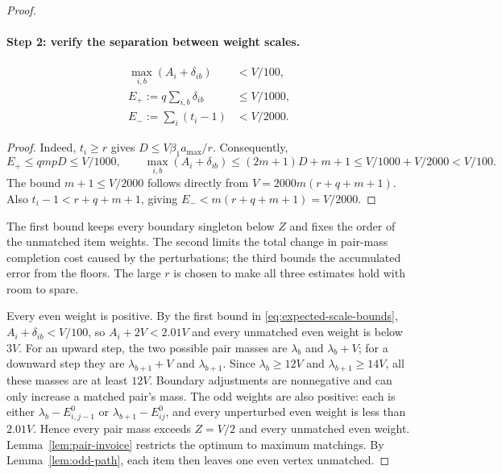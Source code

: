 \begin{proof}
\paragraph{Step 2: verify the separation between weight scales.}
\begin{claim}
\begin{equation}\label{eq:expected-scale-bounds}
 \begin{split}
 \max_{i,b}(A_i+\delta_{ib})&<V/100,\\
 E_+ :=q\sum_{i,b}\delta_{ib}&\le V/1000,\\
 E_- :=\sum_i(t_i-1)&<V/2000.
 \end{split}
\end{equation}
\end{claim}
\begin{proof}
Indeed, $t_i\ge r$ gives $D\le V\beta_1a_{\max}/r$.
Consequently,
\[
 E_+\le qmpD\le V/1000,
 \qquad
 \max_{i,b}(A_i+\delta_{ib})
 \le(2m+1)D+m+1
 \le V/1000+V/2000<V/100.
\]
The bound $m+1\le V/2000$ follows directly from
$V=2000m(r+q+m+1)$.
Also $t_i-1<r+q+m+1$, giving
$E_-<m(r+q+m+1)=V/2000$.
\end{proof}
The first bound keeps every boundary singleton below $Z$ and fixes
the order of the unmatched item weights. The second limits the total
change in pair-mass completion cost caused by the perturbations; the
third bounds the accumulated error from the floors. The large $r$
is chosen to make all three estimates hold with room to spare.

Every even weight is positive. By the first bound in
\eqref{eq:expected-scale-bounds}, $A_i+\delta_{ib}<V/100$, so
$A_i+2V<2.01V$ and every unmatched even weight is below $3V$.
For an upward step, the two possible pair masses are
$\lambda_b$ and $\lambda_b+V$; for a downward step they are
$\lambda_{b+1}+V$ and $\lambda_{b+1}$. Since
$\lambda_b\ge12V$ and $\lambda_{b+1}\ge14V$, all these masses are
at least $12V$. Boundary adjustments are nonnegative and can only
increase a matched pair's mass. The odd weights are also positive:
each is either $\lambda_b-E^0_{i,j-1}$ or
$\lambda_{b+1}-E^0_{ij}$, and every unperturbed even weight is
less than $2.01V$. Hence every pair mass exceeds $Z=V/2$ and every
unmatched even weight.
Lemma~\ref{lem:pair-invoice} restricts the optimum to maximum
matchings. By Lemma~\ref{lem:odd-path}, each item then leaves
one even vertex unmatched.


\end{proof}
